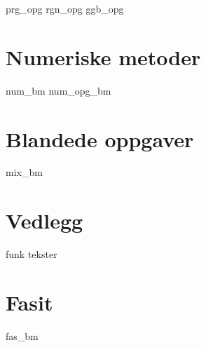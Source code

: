 {prg_opg}
{rgn_opg}	
{ggb_opg}

\chapter{Numeriske metoder \label{Numeriskemetoder}}
{num_bm}
{num_opg_bm}

\chapter{Blandede oppgaver}
{mix_bm}

\chapter*{Vedlegg} 
\newpage
{}
{funk}
{tekster}

\chapter*{Fasit}
{fas_bm}








